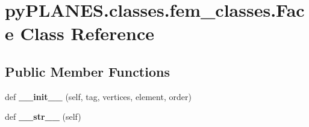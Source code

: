 \hypertarget{classpy_p_l_a_n_e_s_1_1classes_1_1fem__classes_1_1_face}{}\section{py\+P\+L\+A\+N\+E\+S.\+classes.\+fem\+\_\+classes.\+Face Class Reference}
\label{classpy_p_l_a_n_e_s_1_1classes_1_1fem__classes_1_1_face}
\subsection*{Public Member Functions}
\begin{DoxyCompactItemize}
\item 
\mbox{\label{classpy_p_l_a_n_e_s_1_1classes_1_1fem__classes_1_1_face_af57837060ba996945d520ddad2761862}} 
def {\bfseries \+\_\+\+\_\+init\+\_\+\+\_\+} (self, tag, vertices, element, order)
\item 
\mbox{\label{classpy_p_l_a_n_e_s_1_1classes_1_1fem__classes_1_1_face_a33e3e3d15e9420bf57387f0334580455}} 
def {\bfseries \+\_\+\+\_\+str\+\_\+\+\_\+} (self)
\end{DoxyCompactItemize}

